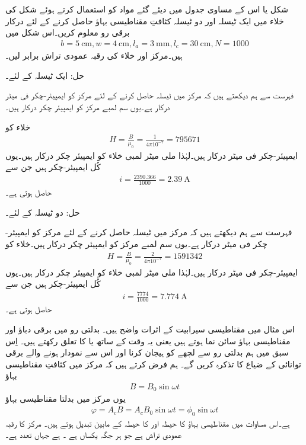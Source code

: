 %
شکل   یا اس کے مساوی جدول  میں دیئے گئے مواد کو استعمال کرتے ہوئے شکل   کی خلاء میں ایک ٹیسلہ اور دو ٹیسلہ کثافتِ  مقناطیسی بہاؤ حاصل کرنے کے لئے درکار برقی رو معلوم کریں۔اس شکل میں
\begin{align*}
b=\SI{5}{\centi\meter},w=\SI{4}{\centi\meter},l_a=\SI{3}{\milli\meter},l_c=\SI{30}{\centi\meter},N=1000
\end{align*}
ہیں۔مرکز اور خلاء کی رقبہ عمودی تراش برابر لیں۔

حل: ایک ٹیسلہ کے لئے۔

 فہرست  سے ہم دیکھتے ہیں کہ مرکز میں  ٹیسلہ  حاصل کرنے کے لئے  مرکز کو   ایمپیئر-چکر فی  میٹر  درکار ہے۔یوں  سم لمبے مرکز کو   ایمپیئر چکر درکار ہیں۔

خلاء کو
\begin{align*}
H=\frac{B}{\mu_0}=\frac{1}{4\pi 10^{-7}}=\num{795671}
\end{align*}
ایمپیئر-چکر فی میٹر درکار ہیں۔لہٰذا  ملی میٹر لمبی خلاء کو  ایمپیئر چکر درکار ہیں۔یوں کُل ایمپیئر-چکر  ہیں جن سے 
\begin{align*}
i=\frac{2390.366}{1000}=\SI{2.39}{\ampere}
\end{align*}	
حاصل ہوتی ہے۔

حل: دو ٹیسلہ کے لئے۔

فہرست سے ہم دیکھتے ہیں کہ مرکز میں  ٹیسلہ  حاصل کرنے کے لئے  مرکز کو  ایمپیئر-چکر فی میٹر  درکار ہے۔یوں  سم لمبے مرکز کو  ایمپیئر چکر درکار ہیں۔خلاء کو
\begin{align*}
H=\frac{B}{\mu_0}=\frac{2}{4\pi 10^{-7}}=\num{1591342}
\end{align*}
ایمپیئر-چکر فی میٹر درکار ہیں۔لہٰذا  ملی میٹر لمبی خلاء کو    ایمپیئر چکر درکار ہیں۔یوں کُل ایمپیئر-چکر 	ہیں جن سے 
\begin{align*}
i=\frac{7774}{1000}=\SI{7.774}{\ampere}
\end{align*}
حاصل ہوتی ہے۔

اس مثال میں مقناطیسی سیرابیت کے اثرات واضح ہیں۔ 
%
بدلتی رو میں برقی دباؤ اور مقناطیسی بہاؤ سائن نما ہوتے ہیں یعنی یہ وقت کے ساتھ  یا  کا تعلق رکھتے ہیں۔ اِس سبق میں ہم بدلتی رو سے لچھے کو ہیجان کرنا اور اس سے نمودار ہونے والے برقی توانائی  کے ضیاع  کا تذکرہ  کریں گے۔ ہم فرض کرتے ہیں کہ مرکز میں کثافتِ مقناطیسی بہاؤ 
\begin{align}
B=B_0 \sin \omega t
\end{align}
یوں مرکز میں بدلتا مقناطیسی بہاؤ 
\begin{align}
\varphi=A_c B=A_c B_0 \sin \omega t=\phi_0 \sin \omega t
\end{align}
ہے۔اس مساوات میں مقناطیسی بہاؤ کا حیطہ   اور  کا حیطہ  کے مابین تبدیل ہوتے ہیں۔ مرکز کا رقبہ عمودی تراش ہے جو ہر جگہ یکساں ہے ۔ ہے جہاں  تعدد ہے۔


